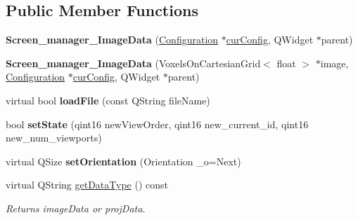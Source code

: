 \subsection*{Public Member Functions}
\begin{DoxyCompactItemize}
\item 
\mbox{\label{classScreen__manager__ImageData_ae2c06f1e08b0dce97fa29564c09b363a}} 
{\bfseries Screen\+\_\+manager\+\_\+\+Image\+Data} (\mbox{\hyperlink{classConfiguration}{Configuration}} $\ast$\mbox{\hyperlink{classScreen__manager_add6a20bb797b0a544aed8b84371a4f24}{cur\+Config}}, Q\+Widget $\ast$parent)
\item 
\mbox{\label{classScreen__manager__ImageData_aaa3133f02c9f659784c543d9123dad41}} 
{\bfseries Screen\+\_\+manager\+\_\+\+Image\+Data} (Voxels\+On\+Cartesian\+Grid$<$ float $>$ $\ast$image, \mbox{\hyperlink{classConfiguration}{Configuration}} $\ast$\mbox{\hyperlink{classScreen__manager_add6a20bb797b0a544aed8b84371a4f24}{cur\+Config}}, Q\+Widget $\ast$parent)
\item 
\mbox{\label{classScreen__manager__ImageData_a6892a6ecf23c6c989138a3dd1c6bbb02}} 
virtual bool {\bfseries load\+File} (const Q\+String file\+Name)
\item 
\mbox{\label{classScreen__manager__ImageData_aea1b49dd7e2ee80c81ec270b97788764}} 
bool {\bfseries set\+State} (qint16 new\+View\+Order, qint16 new\+\_\+current\+\_\+id, qint16 new\+\_\+num\+\_\+viewports)
\item 
\mbox{\label{classScreen__manager__ImageData_ae977853c806bf1b7eee47ee4eefb74e4}} 
virtual Q\+Size {\bfseries set\+Orientation} (Orientation \+\_\+o=Next)
\item 
\mbox{\label{classScreen__manager__ImageData_a16f2f25a0bdc587ace3cbddeb2bdc925}} 
virtual Q\+String \mbox{\hyperlink{classScreen__manager__ImageData_a16f2f25a0bdc587ace3cbddeb2bdc925}{get\+Data\+Type}} () const
\begin{DoxyCompactList}\small\item\em Returns image\+Data or proj\+Data. \end{DoxyCompactList}\item 

\end{DoxyCompactItemize}
